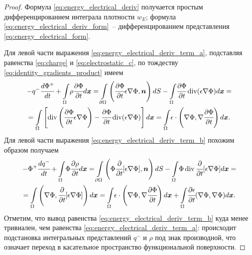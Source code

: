 \begin{proof}
Формула \eqref{eq:energy_electrical_deriv} получается простым дифференцированием интеграла плотности $w_E$; формула \eqref{eq:energy_electrical_deriv_form}~-- дифференцированием представления \eqref{eq:energy_electrical_form}.

Для левой части выражения \eqref{eq:energy_electrical_deriv_term_a}, подставляя равенства \eqref{eq:charge} и \eqref{eq:electrostatic_c}, по тождеству \eqref{eq:identity_gradients_product} имеем
\begin{multline*}
    -q^- \cfrac{d \Phi^+}{dt} + {\int\limits_\Omega} \rho \cfrac{\partial \Phi}{\partial t} d {\boldsymbol{x}} = {\int\limits_{\partial \Omega}} \left( \cfrac{\partial \Phi}{\partial t} \epsilon \nabla \Phi, {\boldsymbol{n}} \right) dS - {\int\limits_\Omega} \cfrac{\partial \Phi}{\partial t} \operatorname{{div}}(\epsilon \nabla \Phi) d {\boldsymbol{x}} = \\ = {\int\limits_\Omega} \left[ \operatorname{{div}} \left( \cfrac{\partial \Phi}{\partial t} \epsilon \nabla \Phi \right) - \cfrac{\partial \Phi}{\partial t} \operatorname{{div}}(\epsilon \nabla \Phi) \right] d {\boldsymbol{x}} = {\int\limits_\Omega} \epsilon \cdot \left( \nabla \Phi, \nabla \cfrac{\partial \Phi}{\partial t} \right) d {\boldsymbol{x}}.
\end{multline*}
Для левой части выражения \eqref{eq:energy_electrical_deriv_term_b} похожим образом получаем
\begin{multline*}
    -\Phi^+ \cfrac{d q^-}{dt} + {\int\limits_\Omega} \Phi \cfrac{\partial \rho}{\partial t} d {\boldsymbol{x}} = {\int\limits_{\partial \Omega}} \left( \Phi \cfrac{\partial }{\partial t}[\epsilon \nabla \Phi], {\boldsymbol{n}} \right) dS - {\int\limits_\Omega} \Phi \operatorname{{div}} \cfrac{\partial }{\partial t}[\epsilon \nabla \Phi] d {\boldsymbol{x}} = \\ = {\int\limits_\Omega} \left( \nabla \Phi, \cfrac{\partial }{\partial t}[\epsilon \nabla \Phi] \right) d {\boldsymbol{x}} = {\int\limits_\Omega} \epsilon \cdot \left( \nabla \Phi, \nabla \cfrac{\partial \Phi}{\partial t} \right) d {\boldsymbol{x}} + {\int\limits_\Omega} \cfrac{\partial \epsilon}{\partial t} (\nabla \Phi, \nabla \Phi) d {\boldsymbol{x}}.
\end{multline*}
Отметим, что вывод равенства \eqref{eq:energy_electrical_deriv_term_b} куда менее тривиален, чем равенства \eqref{eq:energy_electrical_deriv_term_a}: происходит подстановка интегральных представлений $q^-$ и $\rho$ под знак производной, что означает переход в касательное пространство функциональной поверхности.
\end{proof}


